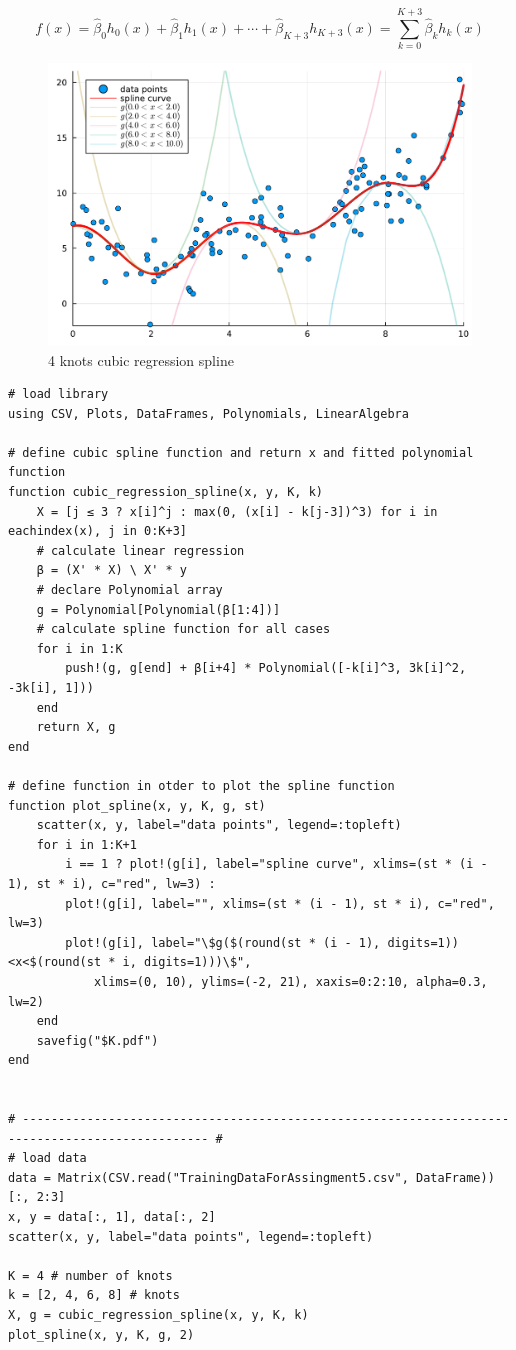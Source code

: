 \documentclass[dvipdfmx]{ujarticle}
\begin{document}
\begin{equation}
f(x)=\hat\beta_{0} h_{0}(x)+\hat\beta_{1} h_{1}(x)+\cdots+\hat\beta_{K+3} h_{K+3}(x)=\sum_{k=0}^{K+3} \hat\beta_{k} h_{k}(x)
\end{equation}

\begin{figure}[htbp]
    \centering
    \includegraphics[width=.7\textwidth]{Result/4.pdf}
    \caption{4 knots cubic regression spline}
\end{figure}

\small{
\begin{screen}
\begin{verbatim}
# load library
using CSV, Plots, DataFrames, Polynomials, LinearAlgebra

# define cubic spline function and return x and fitted polynomial function
function cubic_regression_spline(x, y, K, k)
    X = [j ≤ 3 ? x[i]^j : max(0, (x[i] - k[j-3])^3) for i in eachindex(x), j in 0:K+3]
    # calculate linear regression
    β = (X' * X) \ X' * y
    # declare Polynomial array
    g = Polynomial[Polynomial(β[1:4])]
    # calculate spline function for all cases
    for i in 1:K
        push!(g, g[end] + β[i+4] * Polynomial([-k[i]^3, 3k[i]^2, -3k[i], 1]))
    end
    return X, g
end

# define function in otder to plot the spline function
function plot_spline(x, y, K, g, st)
    scatter(x, y, label="data points", legend=:topleft)
    for i in 1:K+1
        i == 1 ? plot!(g[i], label="spline curve", xlims=(st * (i - 1), st * i), c="red", lw=3) :
        plot!(g[i], label="", xlims=(st * (i - 1), st * i), c="red", lw=3)
        plot!(g[i], label="\$g($(round(st * (i - 1), digits=1))<x<$(round(st * i, digits=1)))\$",
            xlims=(0, 10), ylims=(-2, 21), xaxis=0:2:10, alpha=0.3, lw=2)
    end
    savefig("$K.pdf")
end


# ------------------------------------------------------------------------------------------------ #
# load data
data = Matrix(CSV.read("TrainingDataForAssingment5.csv", DataFrame))[:, 2:3]
x, y = data[:, 1], data[:, 2]
scatter(x, y, label="data points", legend=:topleft)

K = 4 # number of knots
k = [2, 4, 6, 8] # knots
X, g = cubic_regression_spline(x, y, K, k)
plot_spline(x, y, K, g, 2)

\end{verbatim}
\end{screen}}\normalsize
\end{document}
